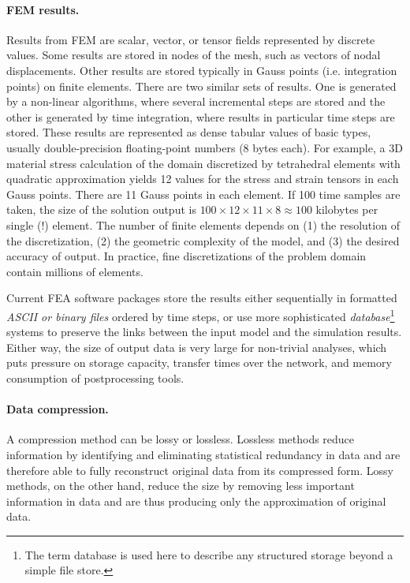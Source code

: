 \paragraph{FEM results.} Results from FEM are scalar, vector, or tensor fields represented by discrete values. Some results are stored in nodes of the mesh, such as vectors of nodal displacements. Other results are stored typically in Gauss points (i.e. integration points) on finite elements. There are two similar sets of results. One is generated by a non-linear algorithms, where several incremental steps are stored and the other is generated by time integration, where results in particular time steps are stored. These results are represented as dense tabular values of basic types, usually double-precision floating-point numbers (8 bytes each). For example, a 3D material stress calculation of the domain discretized by tetrahedral elements with quadratic approximation yields 12 values for the stress and strain tensors in each Gauss points. There are 11 Gauss points in each element. If 100 time samples are taken, the size of the solution output is $100 \times 12 \times 11 \times 8 \approx 100$ kilobytes per single (!) element. The number of finite elements depends on (1) the resolution of the discretization, (2) the geometric complexity of the model, and (3) the desired accuracy of output. In practice, fine discretizations of the problem domain contain millions of elements.

Current FEA software packages store the results either sequentially in formatted \textit{ASCII or binary files} ordered by time steps, or use more sophisticated \textit{database}\footnote{The term database is used here to describe any structured storage beyond a simple file store.} systems to preserve the links between the input model and the simulation results. Either way, the size of output data is very large for non-trivial analyses, which puts pressure on storage capacity, transfer times over the network, and memory consumption of postprocessing tools.

\paragraph{Data compression.} A compression method can be lossy or lossless. Lossless methods reduce information by identifying and eliminating statistical redundancy in data and are therefore able to fully reconstruct original data from its compressed form. Lossy methods, on the other hand, reduce the size by removing less important information in data and are thus producing only the approximation of original data.

